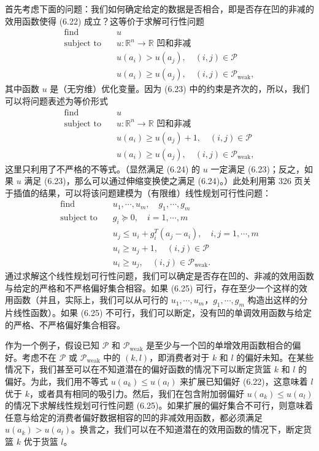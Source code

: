 \documentclass[UTF8,12pt,a4paper,fontset=fandol]{ctexart}
\begin{document}
首先考虑下面的问题：我们如何确定给定的数据是否相合，即是否存在凹的非减的效用函数使得 (6.22) 成立？这等价于求解可行性问题
\begin{equation}
\begin{aligned}
\text{find}\quad & u\\
\text{subject to}\quad & u:\mathbb{R}^n\to\mathbb{R}\text{ 凹和非减}\\
& u(a_i)>u(a_j),\quad (i,j)\in\mathcal{P}\\
& u(a_i)\geq u(a_j),\quad (i,j)\in\mathcal{P}_{\mathrm{weak}},
\end{aligned}
\tag{6.23}
\end{equation}
其中函数 $u$ 是（无穷维）优化变量。因为 (6.23) 中的约束是齐次的，所以，我们可以将问题表述为等价形式
\begin{equation}
\begin{aligned}
\text{find}\quad & u\\
\text{subject to}\quad & u:\mathbb{R}^n\to\mathbb{R}\text{ 凹和非减}\\
& u(a_i)\geq u(a_j)+1,\quad (i,j)\in\mathcal{P}\\
& u(a_i)\geq u(a_j),\quad (i,j)\in\mathcal{P}_{\mathrm{weak}},
\end{aligned}
\tag{6.24}
\end{equation}
这里只利用了不严格的不等式。（显然满足 (6.24) 的 $u$ 一定满足 (6.23)；反之，如果 $u$ 满足 (6.23)，那么可以通过伸缩变换使之满足 (6.24)。）此处利用第 326 页关于插值的结果，可以将该问题建模为（有限维）线性规划可行性问题：
\begin{equation}
\begin{aligned}
\text{find}\quad & u_1,\cdots,u_m,\quad g_1,\cdots,g_m\\
\text{subject to}\quad & g_i\succeq 0,\quad i=1,\cdots,m\\
& u_j\leq u_i+g_i^T(a_j-a_i),\quad i,j=1,\cdots,m\\
& u_i\geq u_j+1,\quad (i,j)\in\mathcal{P}\\
& u_i\geq u_j,\quad (i,j)\in\mathcal{P}_{\mathrm{weak}}.
\end{aligned}
\tag{6.25}
\end{equation}
通过求解这个线性规划可行性问题，我们可以确定是否存在凹的、非减的效用函数与给定的严格和不严格偏好集合相容。如果 (6.25) 可行，存在至少一个这样的效用函数（并且，实际上，我们可以从可行的 $u_1,\cdots,u_m$，$g_1,\cdots,g_m$ 构造出这样的分片线性函数）。如果 (6.25) 不可行，我们可以断定，没有凹的单调效用函数与给定的严格、不严格偏好集合相容。

作为一个例子，假设已知 $\mathcal{P}$ 和 $\mathcal{P}_{\mathrm{weak}}$ 是至少与一个凹的单增效用函数相合的偏好。考虑不在 $\mathcal{P}$ 或 $\mathcal{P}_{\mathrm{weak}}$ 中的 $(k,l)$，即消费者对于 $k$ 和 $l$ 的偏好未知。在某些情况下，我们甚至可以在不知道潜在的偏好函数的情况下可以断定货篮 $k$ 和 $l$ 的偏好。为此，我们用不等式 $u(a_k)\leq u(a_l)$ 来扩展已知偏好 (6.22)，这意味着 $l$ 优于 $k$，或者具有相同的吸引力。然后，我们在包含附加弱偏好 $u(a_k)\leq u(a_l)$ 的情况下求解线性规划可行性问题 (6.25)。如果扩展的偏好集合不可行，则意味着任意与给定的消费者偏好数据相容的凹的非减效用函数，都必须满足 $u(a_k)>u(a_l)$。换言之，我们可以在不知道潜在的效用函数的情况下，断定货篮 $k$ 优于货篮 $l$。
\end{document}
